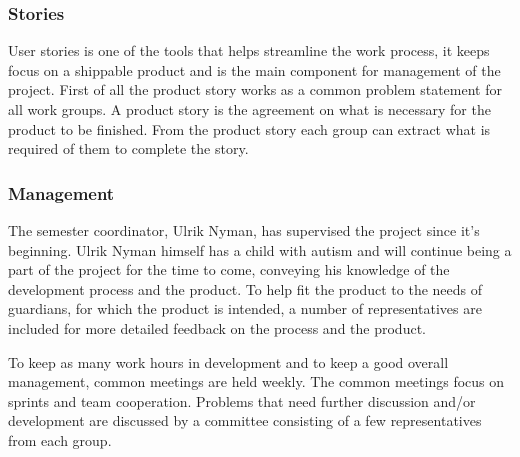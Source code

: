 \subsubsection{Stories}
\label{subsub:stories}
User stories is one of the tools that helps streamline the work process, it keeps focus on a shippable product and is the main component for management of the project. First of all the product story works as a common problem statement for all work groups. A product story is the agreement on what is necessary for the product to be finished. From the product story each group can extract what is required of them to complete the story.

\subsubsection{Management}
\label{subsub:management}
The semester coordinator, Ulrik Nyman, has supervised the project since it's beginning. Ulrik Nyman himself has a child with autism and will continue being a part of the project for the time to come, conveying his knowledge of the development process and the product.
To help fit the product to the needs of guardians, for which the product is intended, a number of representatives are included for more detailed feedback on the process and the product.


To keep as many work hours in development and to keep a good overall management, common meetings are held weekly.
The common meetings focus on sprints and team cooperation. Problems that need further discussion and/or development are discussed by a committee consisting of a few representatives from each group.

